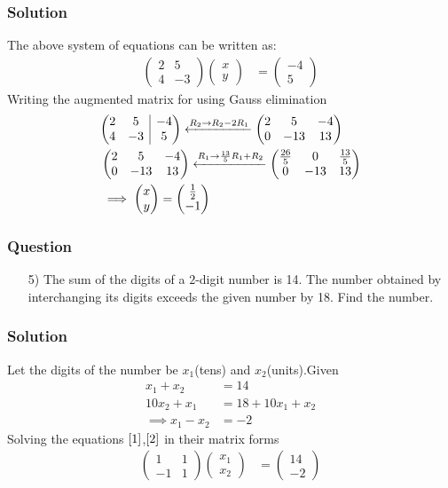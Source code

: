 \documentclass{beamer}
\makeatletter
\theoremstyle{remark}
\newcommand{\myvec}[1]{\ensuremath{\begin{pmatrix}#1\end{pmatrix}}}
\newenvironment{amatrix}[1]{%
  \left(\begin{array}{@{}*{#1}{c}|c@{}}
}{%
  \end{array}\right)
}
\makeatother
\begin{document}
\begin{frame}
\frametitle{Solution}
The above system of equations can be written as:
\begin{align}
    \myvec{
        2 & 5\\ 
        4 & -3
    }
    \myvec{
        x\\
        y
    } &= \myvec{
        -4\\
        5
    } \label{8}
    \end{align}
    Writing the augmented matrix for using Gauss elimination
    \begin{align}
        &\begin{amatrix}{2}
   2 & 5 & -4 \\  4 & -3 & 5
 \end{amatrix} \xleftarrow{R_2 \to R_2-2R_1}
  \myvec{
   2 & 5 & -4 \\  0 & -13 & 13
 } 
 \\
&\myvec{
   2 & 5 & -4 \\  0 & -13 & 13
 } \xleftarrow{R_1 \to \frac{13}{5}R_1+R_2}
 \myvec{
   \frac{26}{5} & 0 & \frac{13}{5} \\  0 & -13 & 13
 }  \label{14}
 \\
    & \implies \myvec{
        x\\
        y
    } =
    \myvec{
        \frac{1}{2}\\
        -1
    }
    \end{align}
\end{frame}






\begin{frame}
\frametitle{Question }
\begin{enumerate}
    \item[5)]
The sum of the digits of a $2$-digit number is 14. The number obtained by interchanging     its digits exceeds the given number by 18. Find the number.
\end{enumerate}
\end{frame}






\begin{frame}
\frametitle{Solution}
Let the digits of the number be $x_1$(tens) and $x_2$(units).Given
\begin{align}
    x_1+x_2 &= 14 \label{1}\\
    10x_2+x_1 &= 18 + 10x_1+x_2\\
    \implies x_1-x_2 &= -2\label{2}
\end{align}
Solving the equations $\eqref{1}$,$\eqref{2}$ in their matrix forms
\begin{align}
    \myvec{
        1 & 1\\
        -1 & 1
    }
    \myvec{
        x_1\\
        x_2
    } &= \myvec{
        14\\
        -2
    }   \\
    \end{align}
\end{frame}
\end{document}
